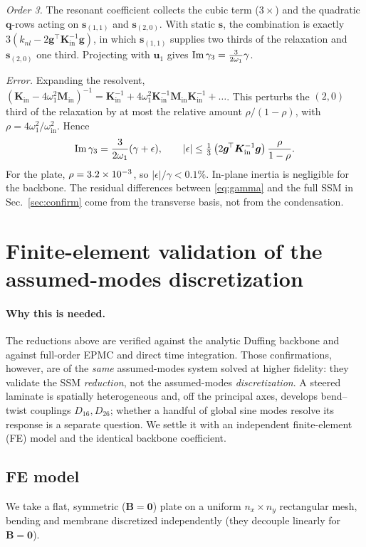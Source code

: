 \emph{Order 3.} The resonant coefficient collects the cubic term ($3\times$) and the
quadratic $\bm q$-rows acting on $\bm s_{(1,1)}$ and $\bm s_{(2,0)}$. With static
$\bm s$, the combination is exactly $3(k_{nl}-2\bm g^{\!\top}\bm K_{\mathrm{in}}^{-1}\bm g)$,
in which $\bm s_{(1,1)}$ supplies two thirds of the relaxation and $\bm s_{(2,0)}$ one
third. Projecting with $\bm u_1$ gives $\operatorname{Im}\gamma_3=\tfrac{3}{2\omega_1}\gamma$.

\emph{Error.} Expanding the resolvent,
$(\bm K_{\mathrm{in}}-4\omega_1^2\bm M_{\mathrm{in}})^{-1}=\bm K_{\mathrm{in}}^{-1}
+4\omega_1^2\bm K_{\mathrm{in}}^{-1}\bm M_{\mathrm{in}}\bm K_{\mathrm{in}}^{-1}+\dots$. This
perturbs the $(2,0)$ third of the relaxation by at most the relative amount
$\rho/(1-\rho)$, with $\rho=4\omega_1^2/\omega_{\mathrm{in}}^2$. Hence
\begin{equation*}
\operatorname{Im}\gamma_3=\frac{3}{2\omega_1}(\gamma+\epsilon),\qquad
|\epsilon|\le\tfrac13\,\big(2\bm g^{\!\top}\bm K_{\mathrm{in}}^{-1}\bm g\big)\,\frac{\rho}{1-\rho}.
\end{equation*}
For the plate, $\rho=3.2\times10^{-3}$, so $|\epsilon|/\gamma<0.1\%$. In-plane inertia is
negligible for the backbone. The residual differences between \eqref{eq:gamma} and the
full SSM in Sec.~\ref{sec:confirm} come from the transverse basis, not from the
condensation.

\section{Finite-element validation of the assumed-modes discretization}\label{app:fe}

\paragraph{Why this is needed.} The reductions above are verified against the analytic
Duffing backbone and against full-order EPMC and direct time integration. Those
confirmations, however, are of the \emph{same} assumed-modes system solved at higher
fidelity: they validate the SSM \emph{reduction}, not the assumed-modes
\emph{discretization}. A steered laminate is spatially heterogeneous and, off the
principal axes, develops bend--twist couplings $D_{16},D_{26}$; whether a handful of
global sine modes resolve its response is a separate question. We settle it with an
independent finite-element (FE) model and the identical backbone coefficient.

\subsection{FE model}
We take a flat, symmetric ($\bm B=\bm0$) plate on a uniform $n_x\times n_y$ rectangular
mesh, bending and membrane discretized independently (they decouple linearly for
$\bm B=\bm 0$).

